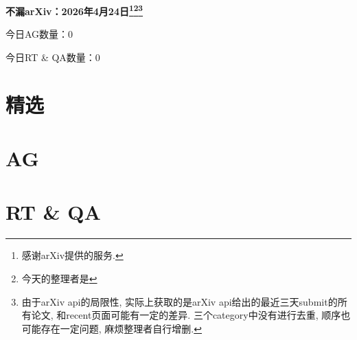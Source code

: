 \documentclass[9pt, a4paper]{article}
\theoremstyle{plain}
\theoremstyle{definition}
\theoremstyle{remark}
\newcommand{\AGnumber}{0}
\newcommand{\RTQAnumber}{0}
\newcommand{\NewestDate}{2026年4月24日}
\newcommand{\todayarXiver}{} %
\begin{document}
\begin{center}
    \Huge\textbf{不漏arXiv：\NewestDate\footnote{感谢arXiv提供的服务.}\footnote{今天的整理者是\todayarXiver}\footnote{由于arXiv api的局限性, 实际上获取的是arXiv api给出的最近三天submit的所有论文, 和recent页面可能有一定的差异. 三个category中没有进行去重, 顺序也可能存在一定问题, 麻烦整理者自行增删.}} \\
\end{center}

\setcounter{section}{-1}

\begin{center}
    今日AG数量：\AGnumber
    
    今日RT \& QA数量：\RTQAnumber
    
\end{center}


\section{精选}


\section{AG}

\section{RT \& QA}
\end{document}
